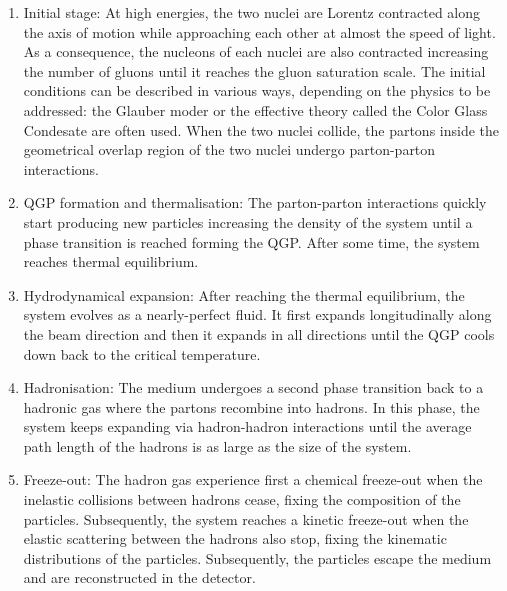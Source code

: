 \begin{enumerate}

\item Initial stage: At high energies, the two nuclei are Lorentz contracted along the axis of motion while approaching each other at almost the speed of light. As a consequence, the nucleons of each nuclei are also contracted increasing the number of gluons until it reaches the gluon saturation scale. The initial conditions can be described in various ways, depending on the physics to be addressed: the Glauber moder or the effective theory called the Color Glass Condesate are often used. When the two nuclei collide, the partons inside the geometrical overlap region of the two nuclei undergo parton-parton interactions.\\

\item QGP formation and thermalisation: The parton-parton interactions quickly start producing new particles increasing the density of the system until a phase transition is reached forming the QGP. After some time, the system reaches thermal equilibrium. \\

\item Hydrodynamical expansion: After reaching the thermal equilibrium, the system evolves as a nearly-perfect fluid. It first expands longitudinally along the beam direction and then it expands in all directions until the QGP cools down back to the critical temperature. \\

\item Hadronisation: The medium undergoes a second phase transition back to a hadronic gas where the partons recombine into hadrons. In this phase, the system keeps expanding via hadron-hadron interactions until the average path length of the hadrons is as large as the size of the system. \\

\item Freeze-out: The hadron gas experience first a chemical freeze-out when the inelastic collisions between hadrons cease, fixing the composition of the particles. Subsequently, the system reaches a kinetic freeze-out when the elastic scattering between the hadrons also stop, fixing the kinematic distributions of the particles. Subsequently, the particles escape the medium and are reconstructed in  the detector.

\end{enumerate}

